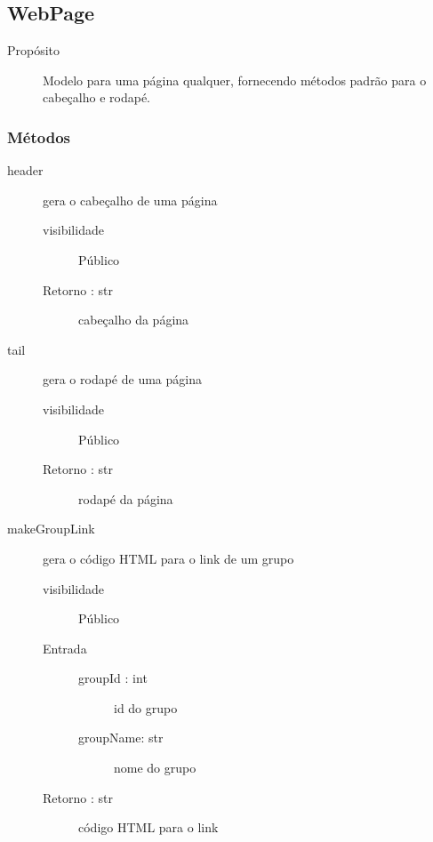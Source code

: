 \documentclass[a4paper]{article}
\begin{document}
	\subsection{WebPage}
	
	\begin{description}
		\item [Propósito] Modelo para uma página qualquer, fornecendo métodos padrão para o cabeçalho e rodapé.
	\end{description}
	
	\subsubsection{Métodos}
		\begin{description} %
		 \item [header] gera o cabeçalho de uma página
			\begin{description} %
				\item [visibilidade] Público			 
				\item [Retorno : str] cabeçalho da página				
			\end{description} %
			
			\item [tail] gera o rodapé de uma página
			\begin{description} %
				\item [visibilidade] Público			 
				\item [Retorno : str] rodapé da página
			\end{description} %
			
			\item [makeGroupLink] gera o código HTML para o link de um grupo
			\begin{description} %
				\item [visibilidade] Público			 
				\item [Entrada] \mbox{}
				\begin{description} %
				 \item [groupId : int] id do grupo
				 \item [groupName: str] nome do grupo
				\end{description} %
				
				\item [Retorno : str] código HTML para o link
			\end{description} %
			

\end{description}
\end{document}
